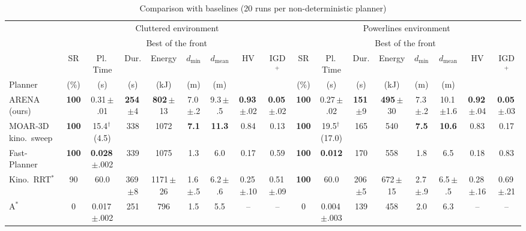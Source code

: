 \documentclass[journal]{IEEEtran}
\newcommand{\sd}[1]{\,{\fontsize{5}{6}\selectfont #1}}    %
\newcommand{\rx}[1]{\textcolor{black!50}{#1}}            %
\begin{document}
\begin{table}[t]
\centering
\caption{Comparison with baselines (20 runs per non-deterministic planner)}
\label{tab:baselines}
\scriptsize
\setlength{\tabcolsep}{1.2pt}
\begin{tabular*}{\textwidth}{@{\extracolsep{\fill}}l@{\hspace{10pt}}cccccccccccccccc@{}}
\toprule
 & \multicolumn{8}{c}{Cluttered environment} & \multicolumn{8}{c}{Powerlines environment} \\
\cmidrule(lr){2-9} \cmidrule(lr){10-17}
 &  &  & \multicolumn{4}{c}{Best of the front} &  &  &  &  & \multicolumn{4}{c}{Best of the front} &  &  \\
\cmidrule(lr){4-7} \cmidrule(lr){12-15}
 & SR & Pl.\,Time & Dur. & Energy & $d_\text{min}$ & $d_\text{mean}$ & HV & IGD$^+$ & SR & Pl.\,Time & Dur. & Energy & $d_\text{min}$ & $d_\text{mean}$ & HV & IGD$^+$ \\
Planner & (\%) & (s) & (s) & (kJ) & (m) & (m) &  &  & (\%) & (s) & (s) & (kJ) & (m) & (m) &  &  \\
\midrule
ARENA (ours) & \textbf{100} & 0.31\sd{$\pm$.01} & \textbf{254}\sd{$\pm$4} & \textbf{802}\sd{$\pm$13} & 7.0\sd{$\pm$.2} & 9.3\sd{$\pm$.5} & \textbf{0.93}\sd{$\pm$.02} & \textbf{0.05}\sd{$\pm$.02} & \textbf{100} & 0.27\sd{$\pm$.02} & \textbf{151}\sd{$\pm$9} & \textbf{495}\sd{$\pm$30} & 7.3\sd{$\pm$.2} & 10.1\sd{$\pm$1.6} & \textbf{0.92}\sd{$\pm$.04} & \textbf{0.05}\sd{$\pm$.03} \\
MOAR-3D kino.\ sweep & \textbf{100} & 15.4$^\dagger$\sd{(4.5)} & 338 & 1072 & \textbf{7.1} & \textbf{11.3} & 0.84 & 0.13 & \textbf{100} & 19.5$^\dagger$\sd{(17.0)} & 165 & 540 & \textbf{7.5} & \textbf{10.6} & 0.83 & 0.17 \\
Fast-Planner~\cite{zhou2019} & \textbf{100} & \textbf{0.028}\sd{$\pm$.002} & 339 & 1075 & 1.3 & 6.0 & 0.17 & 0.59 & \textbf{100} & \textbf{0.012} & 170 & 558 & 1.8 & 6.5 & 0.18 & 0.83 \\
Kino.\ RRT$^*$ & 90 & 60.0 & 369\sd{$\pm$8} & 1171\sd{$\pm$26} & 1.6\sd{$\pm$.5} & 6.2\sd{$\pm$.6} & 0.25\sd{$\pm$.10} & 0.51\sd{$\pm$.09} & \textbf{100} & 60.0 & 206\sd{$\pm$5} & 672\sd{$\pm$15} & 2.7\sd{$\pm$.9} & 6.5\sd{$\pm$.5} & 0.28\sd{$\pm$.16} & 0.69\sd{$\pm$.21} \\
\cmidrule(lr){1-17}
\rx{A$^*$} & \rx{0} & \rx{0.017\sd{$\pm$.002}} & \rx{251} & \rx{796} & \rx{1.5} & \rx{5.5} & -- & -- & \rx{0} & \rx{0.004\sd{$\pm$.003}} & \rx{139} & \rx{458} & \rx{2.0} & \rx{6.3} & -- & -- \\

\end{tabular*}
\end{table}
\end{document}
